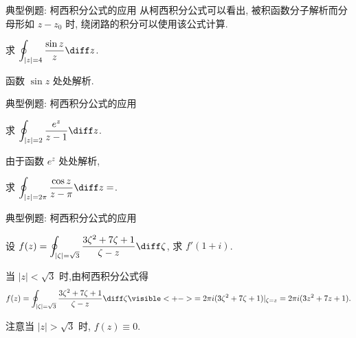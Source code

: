 \begin{frame}{典型例题: 柯西积分公式的应用}
	\onslide<+->
	从柯西积分公式可以看出, 被积函数分子解析而分母形如 $z-z_0$ 时, 绕闭路的积分可以使用该公式计算.

	\onslide<+->
	\begin{example}
		求 $\displaystyle\oint_{|z|=4}\frac{\sin z}z\diff z$.
	\end{example}

	\onslide<+->
	\begin{solution}
		函数 $\sin z$ 处处解析.
		\vspace{-.5\baselineskip}
	\end{solution}
\end{frame}


\begin{frame}{典型例题: 柯西积分公式的应用}
	\onslide<+->
	\begin{example}
		求 $\displaystyle\oint_{|z|=2}\frac{e^z}{z-1}\diff z$.
	\end{example}

	\onslide<+->
	\begin{solution}
		由于函数 $e^z$ 处处解析,
		\vspace{-.5\baselineskip}
	\end{solution}

	\onslide<+->
	\begin{exercise}
		求 $\displaystyle\oint_{|z|=2\pi}\frac{\cos z}{z-\pi}\diff z=$\fillblankframe{$-2\pi i$}.
	\end{exercise}
\end{frame}


\begin{frame}{典型例题: 柯西积分公式的应用}
	\onslide<+->
	\begin{example}
		设 $f(z)=\displaystyle\oint_{|\zeta|=\sqrt3}\frac{3\zeta^2+7\zeta+1}{\zeta-z}\diff \zeta$, 求 $f'(1+i)$.
	\end{example}

	\onslide<+->
	\begin{solution}
		当 $|z|<\sqrt3$ 时,由柯西积分公式得
		\[
			f(z)=\oint_{|\zeta|=\sqrt3}\frac{3\zeta^2+7\zeta+1}{\zeta-z}\diff \zeta
			\visible<+->{=2\pi i(3\zeta^2+7\zeta+1)|_{\zeta=z}=2\pi i(3z^2+7z+1).}
		\]
		\onslide<+->{
			$f'(1+i)=2\pi i(13+6i)=-12\pi+26\pi i$.
		}
	\end{solution}
	\onslide<+->
	注意当 $|z|>\sqrt3$ 时, $f(z)\equiv0$.
\end{frame}


